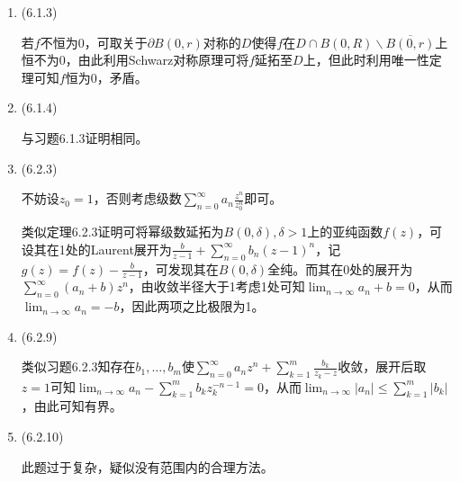 \documentclass[a4paper,UTF8,fontset=windows]{ctexart}
\begin{document}
\begin{enumerate}
    \item (6.1.3)
    
    若$f$不恒为0，可取关于$\partial B(0,r)$对称的$D$使得$f$在$D\cap B(0,R)\backslash\overline{B(0,r)}$上恒不为0，由此利用Schwarz对称原理可将$f$延拓至$D$上，但此时利用唯一性定理可知$f$恒为0，矛盾。
    
    \item (6.1.4)
    
    与习题6.1.3证明相同。
    
    \item (6.2.3)
    
    不妨设$z_0=1$，否则考虑级数$\sum_{n=0}^\infty a_n\frac{z^n}{z_0^n}$即可。
    
    类似定理6.2.3证明可将幂级数延拓为$B(0,\delta),\delta>1$上的亚纯函数$f(z)$，可设其在1处的Laurent展开为$\frac{b}{z-1}+\sum_{n=0}^\infty b_n(z-1)^n$，记$g(z)=f(z)-\frac{b}{z-1}$，可发现其在$B(0,\delta)$全纯。而其在0处的展开为$\sum_{n=0}^\infty (a_n+b)z^n$，由收敛半径大于1考虑1处可知$\lim_{n\to\infty}a_n+b=0$，从而$\lim_{n\to\infty}a_n=-b$，因此两项之比极限为1。
    
    \item (6.2.9)
    
    类似习题6.2.3知存在$b_1,\dots,b_m$使$\sum_{n=0}^\infty a_nz^n+\sum_{k=1}^m\frac{b_k}{z_k-z}$收敛，展开后取$z=1$可知$\lim_{n\to\infty}a_n-\sum_{k=1}^mb_kz_k^{-n-1}=0$，从而$\lim_{n\to\infty}|a_n|\le\sum_{k=1}^m|b_k|$，由此可知有界。
    
    \item (6.2.10)
    
    此题过于复杂，疑似没有范围内的合理方法。
\end{enumerate}
\end{document}
